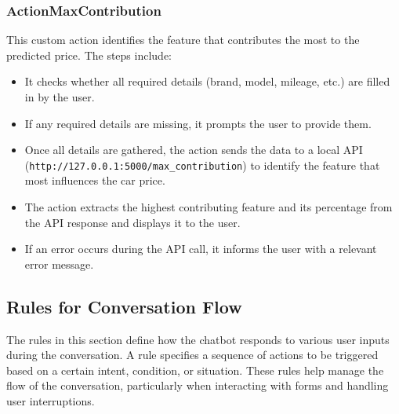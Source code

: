 \documentclass[a4paper,12pt]{article}
\begin{document}
\subsubsection{ActionMaxContribution}
This custom action identifies the feature that contributes the most to the predicted price. The steps include:
\begin{itemize}
	\item It checks whether all required details (brand, model, mileage, etc.) are filled in by the user.
	\item If any required details are missing, it prompts the user to provide them.
	\item Once all details are gathered, the action sends the data to a local API (\texttt{http://127.0.0.1:5000/max\_contribution}) to identify the feature that most influences the car price.
	\item The action extracts the highest contributing feature and its percentage from the API response and displays it to the user.
	\item If an error occurs during the API call, it informs the user with a relevant error message.
\end{itemize}

\subsection{Rules for Conversation Flow}

The rules in this section define how the chatbot responds to various user inputs during the conversation. A rule specifies a sequence of actions to be triggered based on a certain intent, condition, or situation. These rules help manage the flow of the conversation, particularly when interacting with forms and handling user interruptions. 
\end{document}
